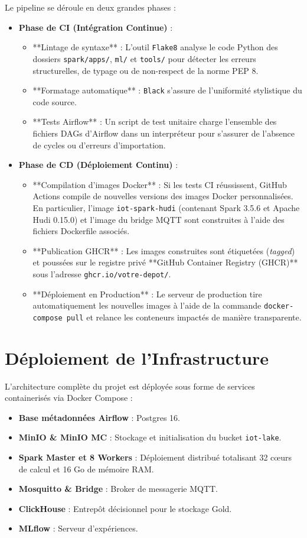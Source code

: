 \documentclass[12pt]{report}
\begin{document}
Le pipeline se déroule en deux grandes phases :
\begin{itemize}
    \item \textbf{Phase de CI (Intégration Continue)} :
    \begin{itemize}
        \item **Lintage de syntaxe** : L'outil \texttt{Flake8} analyse le code Python des dossiers \texttt{spark/apps/}, \texttt{ml/} et \texttt{tools/} pour détecter les erreurs structurelles, de typage ou de non-respect de la norme PEP 8.
        \item **Formatage automatique** : \texttt{Black} s'assure de l'uniformité stylistique du code source.
        \item **Tests Airflow** : Un script de test unitaire charge l'ensemble des fichiers DAGs d'Airflow dans un interpréteur pour s'assurer de l'absence de cycles ou d'erreurs d'importation.
    \end{itemize}
    \item \textbf{Phase de CD (Déploiement Continu)} :
    \begin{itemize}
        \item **Compilation d'images Docker** : Si les tests CI réussissent, GitHub Actions compile de nouvelles versions des images Docker personnalisées. En particulier, l'image \texttt{iot-spark-hudi} (contenant Spark 3.5.6 et Apache Hudi 0.15.0) et l'image du bridge MQTT sont construites à l'aide des fichiers Dockerfile associés.
        \item **Publication GHCR** : Les images construites sont étiquetées (\textit{tagged}) et poussées sur le registre privé **GitHub Container Registry (GHCR)** sous l'adresse \texttt{ghcr.io/votre-depot/}.
        \item **Déploiement en Production** : Le serveur de production tire automatiquement les nouvelles images à l'aide de la commande \texttt{docker-compose pull} et relance les conteneurs impactés de manière transparente.
    \end{itemize}
\end{itemize}

\section{Déploiement de l'Infrastructure}
L'architecture complète du projet est déployée sous forme de services containerisés via Docker Compose :
\begin{itemize}
    \item \textbf{Base métadonnées Airflow} : Postgres 16.
    \item \textbf{MinIO \& MinIO MC} : Stockage et initialisation du bucket \texttt{iot-lake}.
    \item \textbf{Spark Master et 8 Workers} : Déploiement distribué totalisant 32 cœurs de calcul et 16 Go de mémoire RAM.
    \item \textbf{Mosquitto \& Bridge} : Broker de messagerie MQTT.
    \item \textbf{ClickHouse} : Entrepôt décisionnel pour le stockage Gold.
    \item \textbf{MLflow} : Serveur d'expériences.
\end{itemize}
\end{document}
